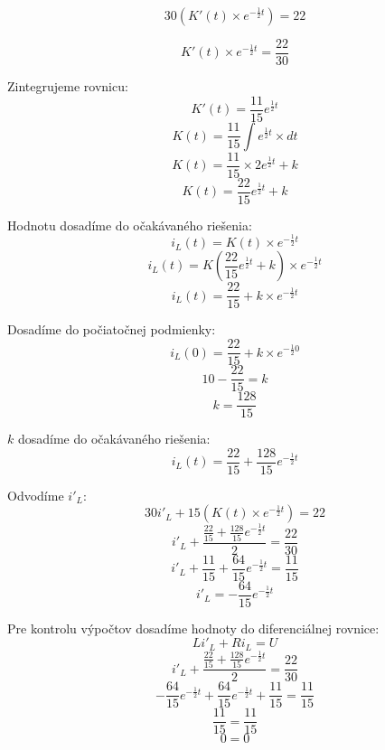 {\large\[30\left(K'(t) \times e^{-\frac{1}{2} t}\right) = 22\]}

{\large\[K'(t) \times e^{-\frac{1}{2} t}= \frac{22}{30}\]}
\bigskip

{\Large Zintegrujeme rovnicu:}
{\large\[K'(t) = \frac{11}{15}e^{\frac{1}{2} t}\]}
{\large\[K(t) = \frac{11}{15} \int e^{\frac{1}{2}t} \times dt\]}
{\large\[K(t) = \frac{11}{15} \times 2e^{\frac{1}{2}t} + k\]}
{\large\[K(t) = \frac{22}{15}e^{\frac{1}{2} t} + k\]}

\newpage

{\Large Hodnotu dosadíme do očakávaného riešenia:}
{\large\[ i_L(t) = K(t) \times e^{-\frac{1}{2} t}\]}
{\large\[ i_L(t) = K\left(\frac{22}{15}e^{\frac{1}{2} t} + k\right) \times e^{-\frac{1}{2} t}\]}
{\large\[ i_L(t) = \frac{22}{15} + k \times e^{-\frac{1}{2} t}\]}
\bigskip

{\Large Dosadíme do počiatočnej podmienky:}
{\large\[ i_L(0) = \frac{22}{15} + k \times e^{-\frac{1}{2} 0}\]}
{\large\[ 10 - \frac{22}{15} = k\]}
{\large\[k = \frac{128}{15}\]}
\bigskip

{\Large $k$ dosadíme do očakávaného riešenia:}
{\large\[ i_L(t) = \frac{22}{15} + \frac{128}{15}e^{-\frac{1}{2} t}\]}

\bigskip

{\Large Odvodíme $i'_L$:}
{\large\[30i'_L + 15\left(K(t) \times e^{-\frac{1}{2} t}\right) = 22\]}
{\large\[i'_L + \frac{\frac{22}{15} + \frac{128}{15}e^{-\frac{1}{2} t}}{2} = \frac{22}{30}\]}
{\large\[i'_L + \frac{11}{15} + \frac{64}{15}e^{-\frac{1}{2} t} = \frac{11}{15} \]}
{\large\[i'_L = -\frac{64}{15}e^{-\frac{1}{2} t} \]}
\bigskip

{\Large Pre kontrolu výpočtov dosadíme hodnoty do diferenciálnej rovnice:}
{\large\[Li'_L + Ri_L = U\]}
{\large\[i'_L + \frac{\frac{22}{15} + \frac{128}{15}e^{-\frac{1}{2} t}}{2} = \frac{22}{30}\]}
{\large\[-\frac{64}{15}e^{-\frac{1}{2} t} + \frac{64}{15}e^{-\frac{1}{2} t} + \frac{11}{15} = \frac{11}{15}\]}
{\large\[\frac{11}{15} = \frac{11}{15}\]}
{\large\[ 0 = 0\]}